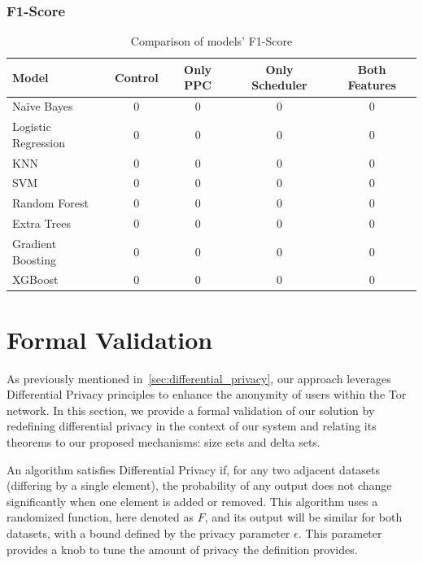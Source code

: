 \subsubsection{F1-Score}
\begin{table}[h!]
    \centering
    \begin{tabular}{lcccc}
        \toprule
        \textbf{Model} & \textbf{Control} & \textbf{Only PPC} & \textbf{Only Scheduler} & \textbf{Both Features} \\
        \midrule
        Naïve Bayes        & 0 & 0 & 0 & 0 \\
        Logistic Regression & 0 & 0 & 0 & 0 \\
        KNN                 & 0 & 0 & 0 & 0 \\
        SVM                 & 0 & 0 & 0 & 0 \\
        Random Forest       & 0 & 0 & 0 & 0 \\
        Extra Trees         & 0 & 0 & 0 & 0 \\
        Gradient Boosting   & 0 & 0 & 0 & 0 \\
        XGBoost             & 0 & 0 & 0 & 0 \\
        \bottomrule
    \end{tabular}
    \caption{Comparison of models' F1-Score}\label{tab:models_f1score_comparison}
\end{table}

\section{Formal Validation}\label{sec:formal_validation}

As previously mentioned in~\autoref{sec:differential_privacy}, our approach leverages Differential Privacy principles to enhance the anonymity of users within the Tor network. In this section, we provide a formal validation of our solution by redefining differential privacy in the context of our system and relating its theorems to our proposed mechanisms: size sets and delta sets.

An algorithm satisfies Differential Privacy if, for any two adjacent datasets (differing by a single element), the probability of any output does not change significantly when one element is added or removed. This algorithm uses a randomized function, here denoted as $F$, and its output will be similar for both datasets, with a bound defined by the privacy parameter $\epsilon$. This parameter provides a knob to tune the amount of privacy the definition provides.

